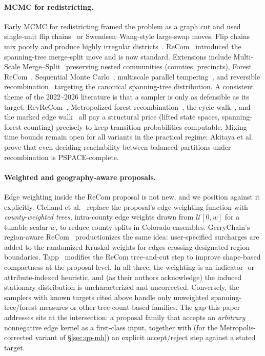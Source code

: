 \documentclass[11pt]{article}
\begin{document}
\paragraph{MCMC for redistricting.}\label{sec:related-mcmc}

Early MCMC for redistricting framed the problem as a graph cut and used
single-unit flip chains~\cite{fifield2020automated} or
Swendsen--Wang-style large-swap moves. Flip chains mix poorly and
produce highly irregular districts~\cite{deford2021recombination,
najt2024empirical}. ReCom~\cite{deford2021recombination} introduced
the spanning-tree merge-split move and is now standard. Extensions
include Multi-Scale Merge--Split~\cite{autry2020multiscale} preserving
nested communities (counties, precincts), Forest ReCom~\cite{autry2023metropolized},
Sequential Monte Carlo~\cite{mccartan2023sequential}, multiscale
parallel tempering~\cite{chuang2025multiscale}, and reversible
recombination~\cite{cannon2022spanning} targeting the canonical
spanning-tree distribution. A consistent theme of the 2022--2026
literature is that a sampler is only as defensible as its target:
RevReCom~\cite{cannon2022spanning}, Metropolized forest
recombination~\cite{autry2023metropolized}, the cycle
walk~\cite{deford2025cycle}, and the marked edge
walk~\cite{mcwhorter2025marked} all pay a structural price (lifted
state spaces, spanning-forest counting) precisely to keep transition
probabilities computable. Mixing-time bounds remain open for
all variants in the practical regime; Akitaya et
al.~\cite{akitaya2022reconfiguration} prove that even deciding
reachability between balanced partitions under recombination is
PSPACE-complete.

\paragraph{Weighted and geography-aware proposals.}\label{sec:related-weighted}

Edge weighting inside the ReCom proposal is not new, and we position
against it explicitly. Clelland et
al.~\cite{clelland2022colorado} replace the proposal's edge-weighting
function with \emph{county-weighted trees}, intra-county edge
weights drawn from $\mathcal{U}[0, w]$ for a tunable scalar $w$, to reduce county splits in Colorado ensembles. GerryChain's
region-aware ReCom~\cite{gerrychain2024} productionizes the same idea:
user-specified surcharges are added to the randomized Kruskal weights
for edges crossing designated region boundaries. Tapp~\cite{tapp2025compactness}
modifies the ReCom tree-and-cut step to improve shape-based
compactness at the proposal level. In all three, the weighting is an
indicator- or attribute-indexed heuristic, and (as their authors
acknowledge) the induced stationary distribution is uncharacterized
and uncorrected. Conversely, the samplers with known targets cited
above handle only unweighted spanning-tree/forest measures or other
tree-count-based families. The gap this paper addresses sits at the
intersection: a proposal family that accepts an \emph{arbitrary}
nonnegative edge kernel as a first-class input, together with (for the
Metropolis-corrected variant of \S\ref{sec:qp-mh}) an explicit
accept/reject step against a stated target.
\end{document}

